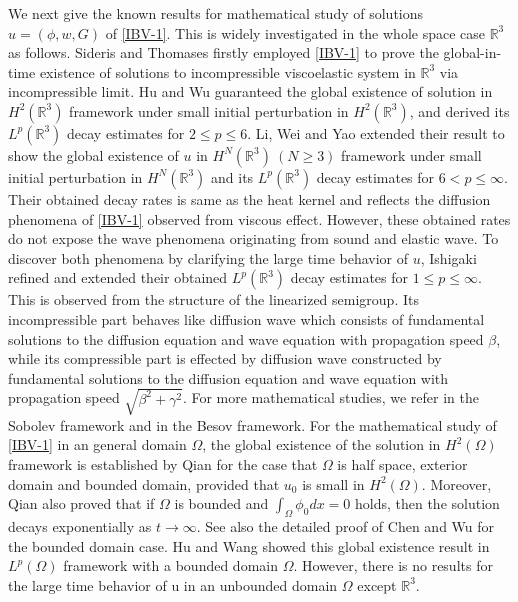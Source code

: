 \documentclass[dvipdfmx,12pt]{article}
\begin{document}
We next give the known results for mathematical study of solutions $u=(\phi,w,G)$ of \eqref{IBV-1}. This is widely investigated in the whole space case $\mathbb{R}^3$ as follows. Sideris and Thomases \cite{SiTh04} firstly employed \eqref{IBV-1} to prove the global-in-time existence of solutions to incompressible viscoelastic system in $\mathbb{R}^3$ via incompressible limit.  Hu and Wu \cite{HW13} guaranteed the global existence of solution in $H^2(\mathbb{R}^3)$ framework under small initial perturbation in $H^2(\mathbb{R}^3)$, and derived its $L^p(\mathbb{R}^3)$ decay estimates for $2\leq p\leq 6$. Li, Wei and Yao \cite{LWY16} extended their result to show the global existence of $u$ in $H^N(\mathbb{R}^3)~(N\ge3)$ framework under small initial perturbation in $H^N(\mathbb{R}^3)$ and its $L^p(\mathbb{R}^3)$ decay estimates for $6< p\leq \infty$. Their obtained decay rates is same as the heat kernel and reflects the diffusion phenomena of \eqref{IBV-1} observed from viscous effect.  However, these obtained rates do not expose the wave phenomena originating from sound and elastic wave. To discover both phenomena by clarifying the large time behavior of $u$, Ishigaki \cite{I20,I22} refined and extended their obtained $L^p(\mathbb{R}^3)$ decay estimates for $1\le p\leq \infty$.  This is observed from the structure of the linearized semigroup.  Its incompressible part behaves like diffusion wave which consists of fundamental solutions to the diffusion equation and wave equation with propagation speed $\beta$, while its compressible part is effected by diffusion wave constructed by fundamental solutions to the diffusion equation and wave equation with propagation speed $\sqrt{\beta^2+\gamma^2}$. For more mathematical studies, we refer  \cite{BZ23,WLY16,WGT17} in the Sobolev framework and \cite{H18,LWXZ16,PX19,QZ10} in the Besov framework. For the mathematical study of \eqref{IBV-1} in an general domain $\Omega$, the global existence of the solution in $H^2(\Omega)$ framework is established by Qian \cite{Q11} for the case that $\Omega$ is half space, exterior domain and bounded domain, provided that  $u_0$ is small in $H^2(\Omega)$. Moreover, Qian \cite{Q11} also proved that if $\Omega$ is bounded and $\int_\Omega \phi_0dx=0$ holds, then the solution decays exponentially as $t\to\infty$. See also the detailed proof of Chen and Wu \cite{CW18} for the bounded domain case. Hu and Wang \cite{HW15} showed this global existence result in $L^p(\Omega)$ framework with a bounded domain $\Omega$. However, there is no results for the large time behavior of u in an unbounded domain $\Omega$ except $\mathbb{R}^3$.
\end{document}
